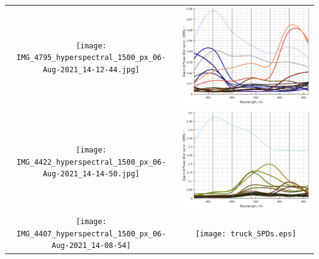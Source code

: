 \documentclass[twocolumn,10pt]{asme2ej}
\begin{document}
\begin{table}[H]
\centering
\begin{tabular}{cc}
\texttt{[image: IMG\_4795\_hyperspectral\_1500\_px\_06-Aug-2021\_14-12-44.jpg]} & \includegraphics[width=0.40\linewidth]{broccoli_bottle_tomato.eps} \\
\texttt{[image: IMG\_4422\_hyperspectral\_1500\_px\_06-Aug-2021\_14-14-50.jpg]} & \includegraphics[width=0.40\linewidth]{vermont_path.eps} \\
\texttt{[image: IMG\_4407\_hyperspectral\_1500\_px\_06-Aug-2021\_14-08-54]} & \texttt{[image: truck\_SPDs.eps]} \\
\end{tabular}
\label{reconstructed_images}
\end{table}

%
\end{document}
